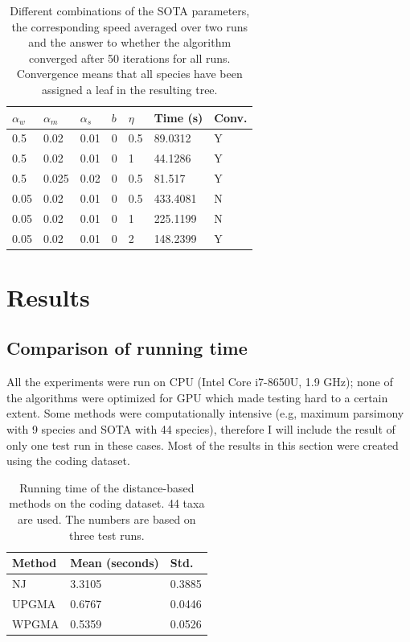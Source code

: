\documentclass[11pt,twocolumn]{article}
\begin{document}
\begin{table}[H]
	\caption{Different combinations of the SOTA parameters, the corresponding speed averaged over two runs and the answer to whether the algorithm converged after 50 iterations for all runs. Convergence means that all species have been assigned a leaf in the resulting tree.}
	\centering
	\begin{tabular}{lllllll}
		\toprule
		$\alpha_w$ & $\alpha_m$ & $\alpha_s$ & $b$ & $\eta$ & Time (s) & Conv. \\
		\midrule
		0.5 & 0.02 & 0.01 & 0 & 0.5 & 89.0312 & Y \\
		0.5 & 0.02 & 0.01 & 0 & 1 & 44.1286 & Y \\
		0.5 & 0.025 & 0.02 & 0 & 0.5 & 81.517 & Y \\
		0.05 & 0.02 & 0.01 & 0 & 0.5 & 433.4081 & N \\
		0.05 & 0.02 & 0.01 & 0 & 1 & 225.1199 & N \\
		0.05 & 0.02 & 0.01 & 0 & 2 & 148.2399 & Y \\
		\bottomrule
	\end{tabular}
	\label{table:sota_parameters}
\end{table}

\section{Results}

\subsection{Comparison of running time}

All the experiments were run on CPU (Intel Core i7-8650U, 1.9 GHz); none of the algorithms were optimized for GPU which made testing hard to a certain extent. Some methods were computationally intensive (e.g, maximum parsimony with 9 species and SOTA with 44 species), therefore I will include the result of only one test run in these cases. Most of the results in this section were created using the coding dataset.

\begin{table}[H]
  \caption{Running time of the distance-based methods on the coding dataset. 44 taxa are used. The numbers are based on three test runs.}
  \centering
  \begin{tabular}{lll}
    \toprule
    Method & Mean (seconds) & Std. \\
    \midrule
    NJ & 3.3105 & 0.3885 \\
    UPGMA & 0.6767 & 0.0446 \\
    WPGMA & 0.5359 & 0.0526 \\	
    \bottomrule
  \end{tabular}
\label{table:distance}
\end{table}
\end{document}
